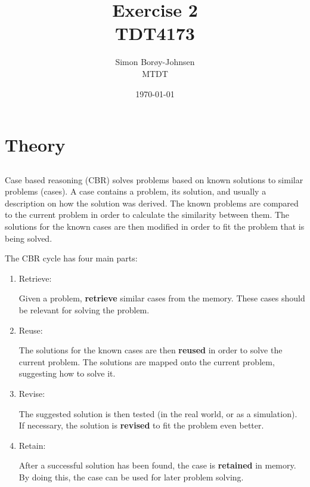 \documentclass{article}
\begin{document}
\title{\textbf{Exercise 2} \\ TDT4173}
\author{Simon Borøy-Johnsen \\ MTDT}
\date{\today}
\maketitle


\section{Theory}
\subsection{}
Case based reasoning (CBR) solves problems based on known solutions to similar problems (cases). A case contains a problem, its solution, and usually a description on how the solution was derived. The known problems are compared to the current problem in order to calculate the similarity between them. The solutions for the known cases are then modified in order to fit the problem that is being solved.

The CBR cycle has four main parts:

\begin{enumerate}
    \item Retrieve:

        Given a problem, \textbf{retrieve} similar cases from the memory. These cases should be relevant for solving the problem.
    
    \item Reuse:
    
        The solutions for the known cases are then \textbf{reused} in order to solve the current problem. The solutions are mapped onto the current problem, suggesting how to solve it.
    
    \item Revise:
    
       The suggested solution is then tested (in the real world, or as a simulation). If necessary, the solution is \textbf{revised} to fit the problem even better.
    
    \item Retain:
    
        After a successful solution has been found, the case is \textbf{retained} in memory. By doing this, the case can be used for later problem solving.
\end{enumerate}
\end{document}
